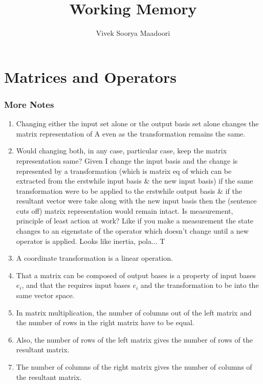 \documentclass[a4paper,12pt]{amsbook}
\newcommand{\0}{{$|0\rangle$}}
\newcommand{\1}{{$|1\rangle$}}
\begin{document}
\author{Vivek Soorya Maadoori}
\title{Working Memory}
\maketitle
\tableofcontents

\chapter{Matrices and Operators}
\subsection{More Notes}

\begin{enumerate}

    \item Changing either the input set alone or the output basis set alone changes the matrix representation of A even as the transformation remains the same. 
    \item Would changing both, in any case, particular case, keep the matrix representation same? Given I change the input basis and the change is represented by a transformation (which is matrix eq of which can be extracted from the erstwhile input basis \& the new input basis) if the same transformation were to be applied to the erstwhile output basis \& if the resultant vector were take along with the new input basis then the (sentence cuts off) matrix representation would remain intact.
Is measurement, principle of least action at work? Like if you make a measurement the state changes to an eigenstate of the operator which doesn't change until a new operator is applied. Looks like inertia, pola... 
T
    
    \item A coordinate transformation is a linear operation.
    \item That a matrix can be composed of output bases is a property of input bases $e_i$, and that the requires input bases $e_i$ and the transformation to be into the same vector space.



    \item In matrix multiplication, the number of columns out of the left matrix and the number of rows in the right matrix have to be equal.
    \item Also, the number of rows of the left matrix gives the number of rows of the resultant matrix.
    \item The number of columns of the right matrix gives the number of columns of the resultant matrix.
        

\end{enumerate}
\end{document}

